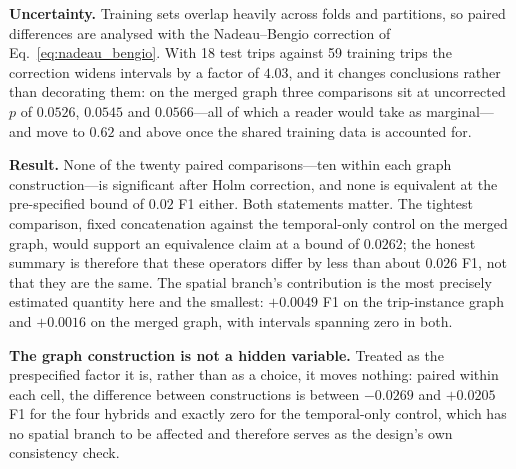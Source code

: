 \documentclass[journal]{IEEEtran}
\begin{document}
\textbf{Uncertainty.} Training sets overlap heavily across folds and
partitions, so paired differences are analysed with the Nadeau--Bengio
correction of Eq.~\ref{eq:nadeau_bengio}. With 18 test trips against 59
training trips the correction widens intervals by a factor of $4.03$, and it
changes conclusions rather than decorating them: on the merged graph three
comparisons sit at uncorrected $p$ of $0.0526$, $0.0545$ and $0.0566$---all of
which a reader would take as marginal---and move to $0.62$ and above once the
shared training data is accounted for.

\textbf{Result.} None of the twenty paired comparisons---ten within each
graph construction---is significant after Holm correction, and none is
equivalent at the pre-specified bound of $0.02$ F1 either. Both statements
matter. The tightest comparison, fixed concatenation against the
temporal-only control on the merged graph, would support an equivalence claim
at a bound of $0.0262$; the honest summary is therefore that these operators
differ by less than about $0.026$ F1, not that they are the same. The
spatial branch's contribution is the most precisely estimated quantity here
and the smallest: $+0.0049$ F1 on the trip-instance graph and $+0.0016$ on
the merged graph, with intervals spanning zero in both.

\textbf{The graph construction is not a hidden variable.} Treated as the
prespecified factor it is, rather than as a choice, it moves nothing: paired
within each cell, the difference between constructions is between $-0.0269$
and $+0.0205$ F1 for the four hybrids and exactly zero for the temporal-only
control, which has no spatial branch to be affected and therefore serves as
the design's own consistency check.
\end{document}
